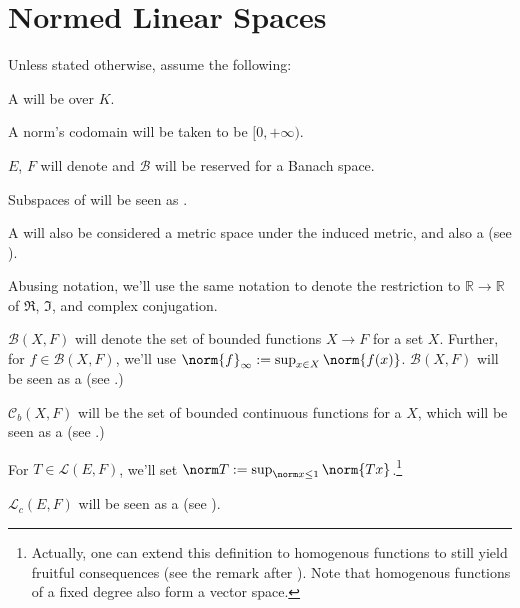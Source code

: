 %

\chapter{Normed Linear Spaces}

\begin{conv}
	Unless stated otherwise, assume the following:
	\begin{assmplist}
		\item A \NLS will be over $K$.
		
		\item A norm's codomain will be taken to be $[0, +\infty)$.
		
		\item $E$, $F$ will denote  and $\mathscr B$ will be reserved for a Banach space.
		
		\item Subspaces of  will be seen as .
		
		\item A \NLS will also be considered a metric space under the induced metric, and also a \TVS (see ).
		
		\item Abusing notation, we'll use the same notation to denote the restriction to $\mathbb R\to\mathbb R$ of $\Re$, $\Im$, and complex conjugation.
		
		\item $\mathcal B(X, F)$ will denote the set of bounded functions $X\to F$ for a set $X$. Further, for $f\in\mathcal B(X, F)$, we'll use $\norm{f}_\infty := \sup_{x\in X}\norm{f(x)}$. $\mathcal B(X, F)$ will be seen as a \NLS (see .)
		
		\item $\mathcal C_b(X, F)$ will be the set of bounded continuous functions for a \TVS $X$, which will be seen as a \NLS (see .)
		
		\item For $T\in\mathcal L(E, F)$, we'll set $\norm T := \sup_{\norm x\le 1}\norm{Tx}$.\footnote{Actually, one can extend this definition to homogenous functions to still yield fruitful consequences (see the remark after ). Note that homogenous functions of a fixed degree also form a vector space.}
		
		\item $\mathcal L_c(E, F)$ will be seen as a \NLS (see ).
	\end{assmplist}
\end{conv}



